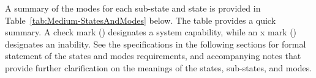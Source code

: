 A summary of the modes for each sub-state and state is provided in Table~\ref{tab:Medium-StatesAndModes} below.
The table provides a quick summary. A check mark (\cmark) designates a system capability, while an x mark (\xmark) designates an inability.
See the specifications in the following sections for formal statement of the states and modes requirements, and accompanying notes that provide further clarification on the meanings of the states, sub-states, and modes.

